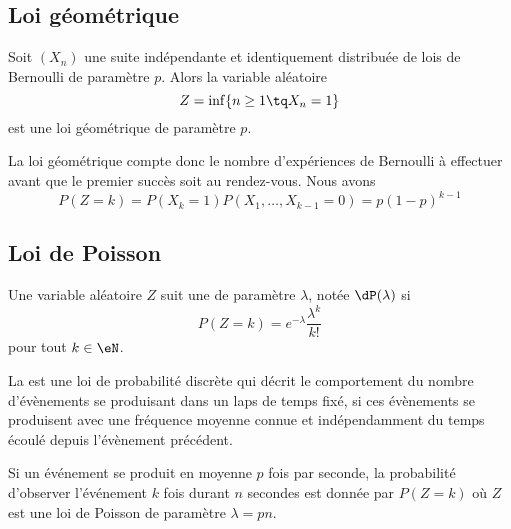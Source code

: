 \subsection{Loi géométrique}

Soit \( (X_n)\) une suite indépendante et identiquement distribuée de lois de Bernoulli de paramètre \( p\). Alors la variable aléatoire
\begin{equation}
    Z=\inf\{ n\geq 1\tq X_n=1 \}
\end{equation}
est une loi géométrique de paramètre \( p\).

La loi géométrique compte donc le nombre d'expériences de Bernoulli à effectuer avant que le premier succès soit au rendez-vous. Nous avons
\begin{equation}
    P(Z=k)=P(X_k=1)P(X_1,\ldots,X_{k-1}=0)=p(1-p)^{k-1}
\end{equation}

\subsection{Loi de Poisson}


Une variable aléatoire \( Z\) suit une  de paramètre \( \lambda\), notée \( \dP(\lambda)\) si
\begin{equation}
    P(Z=k)= e^{-\lambda}\frac{ \lambda^k }{ k! }
\end{equation}
pour tout \( k\in\eN\).

La  est une loi de probabilité discrète qui décrit le comportement du nombre d'évènements se produisant dans un laps de temps fixé, si ces évènements se produisent avec une fréquence moyenne connue et indépendamment du temps écoulé depuis l'évènement précédent. 

Si un événement se produit en moyenne \( p\) fois par seconde, la probabilité d'observer l'événement \( k\) fois durant \( n\) secondes est donnée par \( P(Z=k)\) où \( Z\) est une loi de Poisson de paramètre \( \lambda=pn\).


